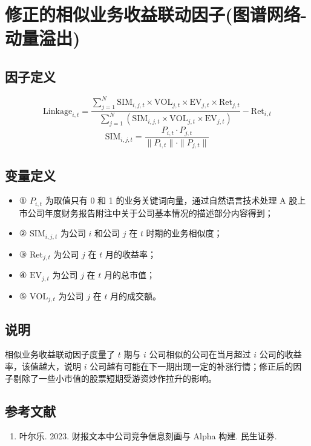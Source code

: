 \documentclass{article}
\begin{document}
\section{修正的相似业务收益联动因子(图谱网络-动量溢出)}

\subsection{因子定义}

\begin{equation}
    \mathrm{Linkage}_{i,t} = \frac{\sum_{j=1}^{N} \mathrm{SIM}_{i,j,t} \times \mathrm{VOL}_{j,t} \times \mathrm{EV}_{j,t} \times \mathrm{Ret}_{j,t}}{\sum_{j=1}^{N} (\mathrm{SIM}_{i,j,t} \times \mathrm{VOL}_{j,t} \times \mathrm{EV}_{j,t})} - \mathrm{Ret}_{i,t}
\end{equation}
\begin{equation}
    \mathrm{SIM}_{i,j,t} = \frac{P_{i,t} \cdot P_{j,t}}{\|P_{i,t}\| \cdot \|P_{j,t}\|}
\end{equation}

\subsection{变量定义}
\begin{itemize}
    \item ① \( P_{i,t} \) 为取值只有 0 和 1 的业务关键词向量，通过自然语言技术处理 A 股上市公司年度财务报告附注中关于公司基本情况的描述部分内容得到；
    \item ② \( \mathrm{SIM}_{i,j,t} \) 为公司 \( i \) 和公司 \( j \) 在 \( t \) 时期的业务相似度；
    \item ③ \( \mathrm{Ret}_{j,t} \) 为公司 \( j \) 在 \( t \) 月的收益率；
    \item ④ \( \mathrm{EV}_{j,t} \) 为公司 \( j \) 在 \( t \) 月的总市值；
    \item ⑤ \( \mathrm{VOL}_{j,t} \) 为公司 \( j \) 在 \( t \) 月的成交额。
\end{itemize}

\subsection{说明}
相似业务收益联动因子度量了 \( t \) 期与 \( i \) 公司相似的公司在当月超过 \( i \) 公司的收益率，该值越大，说明 \( i \) 公司越有可能在下一期出现一定的补涨行情；修正后的因子剔除了一些小市值的股票短期受游资炒作拉升的影响。

\subsection{参考文献}
\begin{enumerate}
    \item 叶尔乐. 2023. 财报文本中公司竞争信息刻画与 Alpha 构建. 民生证券.
\end{enumerate}
\end{document}
